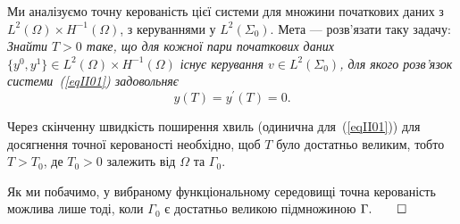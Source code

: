 Ми аналізуємо точну керованість цієї системи для множини початкових даних з $L^2(\Omega) \times H^{-1}(\Omega)$, з керуваннями у $L^2(\Sigma_0)$. Мета — розв'язати таку задачу: \emph{Знайти $T>0$ таке, що для кожної пари початкових даних $\{y^0, y^1\} \in L^2(\Omega) \times H^{-1}(\Omega)$ існує керування $v \in L^2(\Sigma_0)$, для якого розв'язок системи~(\ref{eqII01}) задовольняє}
\begin{equation}\label{eqII02}
y(T) = y^\prime (T) = 0.
\end{equation}

\label{remark:II.2.1}
\begin{remark}
Через скінченну швидкість поширення хвиль (одинична для~(\ref{eqII01})) для досягнення точної керованості необхідно, щоб $T$ було достатньо великим, тобто $T > T_0$, де $T_0 >0$ залежить від $\Omega$ та $\Gamma_0$.

Як ми побачимо, у вибраному функціональному середовищі точна керованість можлива лише тоді, коли $\Gamma_0$ є достатньо великою підмножиною $\Gamma. \quad\quad\hfill \square$
\end{remark}
